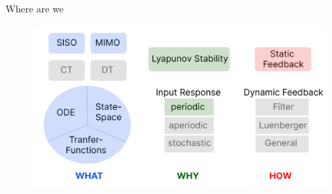 \documentclass{beamer}
\begin{document}
\begin{frame}{Where are we}
	\begin{flushleft}
		
		\begin{figure}
			\centering
			\includegraphics[width=1.0 \linewidth]{Scheme}
		\end{figure}
		
		
	\end{flushleft}
\end{frame}


\myqrframe
\end{document}
